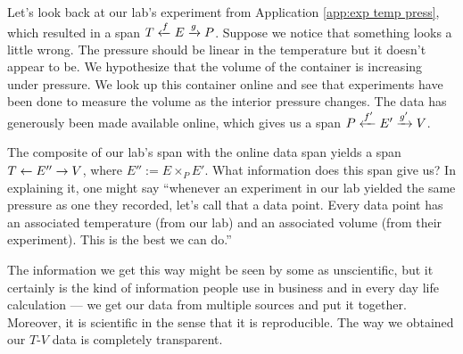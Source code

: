 \begin{applicationENG}\label{app:exp temp press 2}
Let's look back at our lab's experiment from Application \ref{app:exp temp press}, which resulted in a span $T\xleftarrow{f}E\xrightarrow{g}P$. Suppose we notice that something looks a little wrong. The pressure should be linear in the temperature but it doesn't appear to be. We hypothesize that the volume of the container is increasing under pressure. We look up this container online and see that experiments have been done to measure the volume as the interior pressure changes. The data has generously been made available online, which gives us a span $P\xleftarrow{f'}E'\xrightarrow{g'}V$. 

The composite of our lab's span with the online data span yields a span $T\leftarrow E''\rightarrow V$, where $E'':=E\times_PE'$. What information does this span give us? In explaining it, one might say “whenever an experiment in our lab yielded the same pressure as one they recorded, let's call that a data point. Every data point has an associated temperature (from our lab) and an associated volume (from their experiment). This is the best we can do.” 

The information we get this way might be seen by some as unscientific, but it certainly is the kind of information people use in business and in every day life calculation — we get our data from multiple sources and put it together. Moreover, it is scientific in the sense that it is reproducible. The way we obtained our $T$-$V$ data is completely transparent.
\end{applicationENG}

